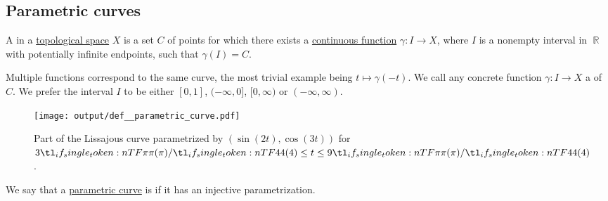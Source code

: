 \subsection{Parametric curves}\label{subsec:parametric_curves}

\begin{definition}\label{def:parametric_curve}\mimprovised
  A  in a \hyperref[def:topological_space]{topological space} \( X \) is a set \( C \) of points for which there exists a \hyperref[def:global_continuity]{continuous function} \( \gamma: I \to X \), where \( I \) is a nonempty interval in \( \BbbR \) with potentially infinite endpoints, such that \( \gamma(I) = C \).

  Multiple functions correspond to the same curve, the most trivial example being \( t \mapsto \gamma(-t) \). We call any concrete function \( \gamma: I \to X \) a  of \( C \). We prefer the interval \( I \) to be either \( [0, 1] \), \( (-\infty, 0] \), \( [0, \infty) \) or \( (-\infty, \infty) \).

  \begin{figure}[!ht]
    \centering
    \texttt{[image: output/def\_\_parametric\_curve.pdf]}
    \caption{Part of the Lissajous curve parametrized by \( (\sin(2t), \cos(3t)) \) for \( 3 \ifrac \pi 4 \leq t \leq 9 \ifrac \pi 4 \).}\label{fig:def:parametric_curve}
  \end{figure}
\end{definition}

\begin{definition}\label{def:simple_curve}\mimprovised
  We say that a \hyperref[def:parametric_curve]{parametric curve} is  if it has an injective parametrization.
\end{definition}


